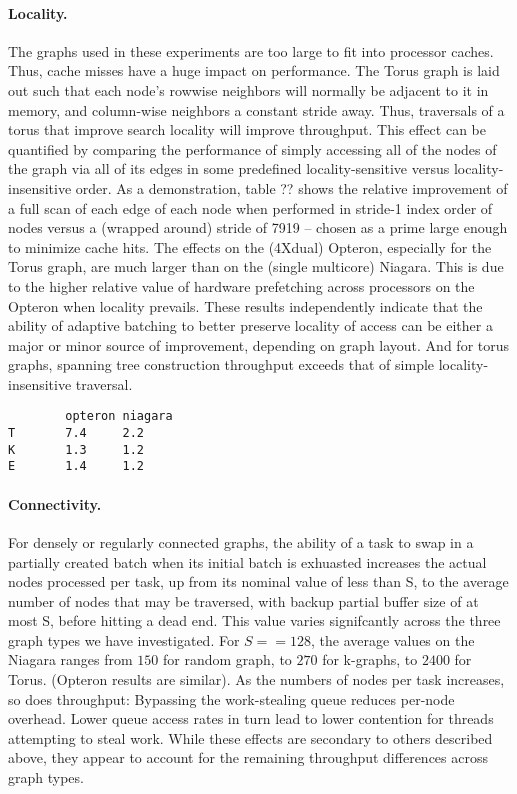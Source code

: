 \paragraph{Locality.} The graphs used in these experiments are too large to fit
into processor caches. Thus, cache misses have a huge impact on
performance. The Torus graph is laid out such that each node's rowwise
neighbors will normally be adjacent to it in memory, and column-wise
neighbors a constant stride away. Thus, traversals of a torus that
improve search locality will improve throughput.  This effect can be
quantified by comparing the performance of simply accessing all of the
nodes of the graph via all of its edges in some predefined
locality-sensitive versus locality-insensitive order.  As a
demonstration, table ?? shows the relative improvement of a full scan
of each edge of each node when performed in stride-1 index order of
nodes versus a (wrapped around) stride of 7919 -- chosen as a prime
large enough to minimize cache hits.  The effects on the (4Xdual)
Opteron, especially for the Torus graph, are much larger than on the
(single multicore) Niagara. This is due to the higher relative value
of hardware prefetching across processors on the Opteron when locality
prevails.  These results independently indicate that the ability of
adaptive batching to better preserve locality of access can be either
a major or minor source of improvement, depending on graph layout.
And for torus graphs, spanning tree construction throughput exceeds
that of simple locality-insensitive traversal.

{\footnotesize
\begin{verbatim}
        opteron niagara
T       7.4     2.2
K       1.3     1.2
E       1.4     1.2
\end{verbatim}}

\paragraph{Connectivity.}  For densely or regularly connected graphs, the
ability of a task to swap in a partially created batch when its
initial batch is exhuasted increases the actual nodes processed per
task, up from its nominal value of less than S, to the average number
of nodes that may be traversed, with backup partial buffer size of at
most S, before hitting a dead end. This value varies signifcantly
across the three graph types we have investigated. For $S==128$, the
average values on the Niagara ranges from $150$ for random graph, to $270$
for k-graphs, to $2400$ for Torus. (Opteron results are similar). As the
numbers of nodes per task increases, so does throughput: Bypassing the
work-stealing queue reduces per-node overhead.  Lower queue access
rates in turn lead to lower contention for threads attempting to steal
work. While these effects are secondary to others described above,
they appear to account for the remaining throughput differences across
graph types.


